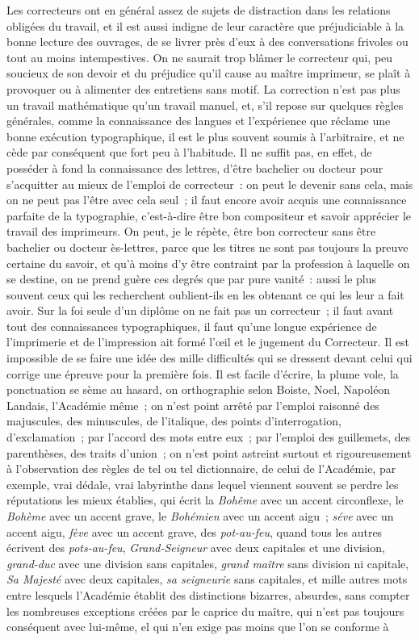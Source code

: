 \documentclass[french,twoside]{book} %
\begin{document}
Les correcteurs ont en général assez de sujets de distraction dans les relations obligées du travail, et il est aussi indigne de leur caractère que préjudiciable à la bonne lecture des ouvrages, de se livrer près d’eux à des conversations frivoles ou tout au moins intempestives. On ne saurait trop blâmer le correcteur qui, peu soucieux de son devoir et du préjudice qu’il cause au maître imprimeur, se plaît à provoquer ou à alimenter des entretiens sans motif. La correction n’est  pas plus un travail mathématique qu’un travail manuel, et, s’il repose sur quelques règles générales, comme la connaissance des langues et l’expérience que réclame une bonne exécution typographique, il est le plus souvent soumis à l’arbitraire, et ne cède par conséquent que fort peu à l’habitude. Il ne suffit pas, en effet, de posséder à fond la connaissance des lettres, d’être bachelier ou docteur pour s’acquitter au mieux de l’emploi de correcteur : on peut le devenir sans cela, mais on ne peut pas l’être avec cela seul ; il faut encore avoir acquis une connaissance parfaite de la typographie, c’est-à-dire être bon compositeur et savoir apprécier le travail des imprimeurs. On peut, je le répète, être bon correcteur sans être bachelier ou docteur ès-lettres, parce que les titres ne sont pas toujours la preuve certaine du savoir, et qu’à moins d’y être contraint par la profession à laquelle on se  destine, on ne prend guère ces degrés que par pure vanité : aussi le plus souvent ceux qui les recherchent oublient-ils en les obtenant ce qui les leur a fait avoir. Sur la foi seule d’un diplôme on ne fait pas un correcteur ; il faut avant tout des connaissances typographiques, il faut qu’une longue expérience de l’imprimerie et de l’impression ait formé l’œil et le jugement du Correcteur. Il est impossible de se faire une idée des mille difficultés qui se dressent devant celui qui corrige une épreuve pour la première fois. Il est facile d’écrire, la plume vole, la ponctuation se sème au hasard, on orthographie selon Boiste, Noel, Napoléon Landais, l’Académie même ; on n’est point arrêté par l’emploi raisonné des majuscules, des minuscules, de l’italique, des points d’interrogation, d’exclamation ; par l’accord des mots entre eux ; par l’emploi des guillemets, des parenthèses, des traits d’union ; on  n’est point astreint surtout et rigoureusement à l’observation des règles de tel ou tel dictionnaire, de celui de l’Académie, par exemple, vrai dédale, vrai labyrinthe dans lequel viennent souvent se perdre les réputations les mieux établies, qui écrit la \emph{Bohême } avec un accent circonflexe, le \emph{Bohème} avec un accent grave, le \emph{Bohémien} avec un accent aigu ; \emph{séve} avec un accent aigu, \emph{fève} avec un accent grave, des \emph{pot-au-feu}, quand tous les autres écrivent des \emph{pots-au-feu}, \emph{Grand-Seigneur} avec deux capitales et une division, \emph{grand-duc} avec une division sans capitales, \emph{grand maître} sans division ni capitale, \emph{Sa Majesté} avec deux capitales, \emph{sa seigneurie} sans capitales, et mille autres mots entre lesquels l’Académie établit des distinctions bizarres, absurdes, sans compter les nombreuses exceptions créées par le caprice du maître, qui n’est pas toujours conséquent avec lui-même, el qui n’en exige pas moins que l’on  se conforme à 
\end{document}

